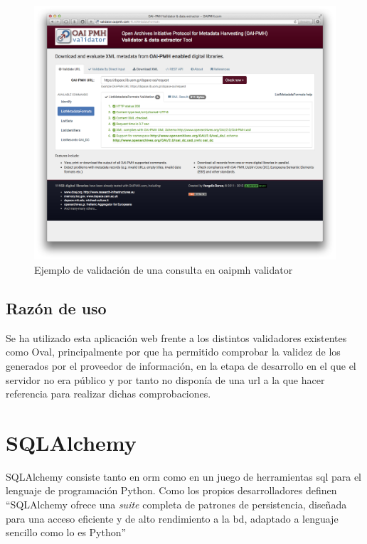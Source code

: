 \begin{figure}[!htbp]
	\centering
	\includegraphics[scale=0.2]{fig/oaipmh_validator_example}
	\caption{Ejemplo de validación de una consulta en \acrshort{oaipmh} validator}
	\label{fig:oai_validator}
\end{figure}

\subsection{Razón de uso}

Se ha utilizado esta aplicación web frente a los distintos validadores existentes como Oval\cite{Oval}, principalmente por que ha permitido comprobar la validez de los  generados por el proveedor de información, en la etapa de desarrollo en el que el servidor no era público y por tanto no disponía de una \acrshort{url} a la que hacer referencia para realizar dichas comprobaciones.

\section{SQLAlchemy}

SQLAlchemy\cite{SQLAlchemy} consiste tanto en \acrfull{orm} como en un juego de herramientas \acrshort{sql} para el lenguaje de programación Python. Como los propios desarrolladores definen ``SQLAlchemy ofrece una \textit{suite} completa de patrones de persistencia, diseñada para una acceso eficiente y de alto rendimiento a la \acrlong{bd}, adaptado a lenguaje sencillo como lo es Python''

